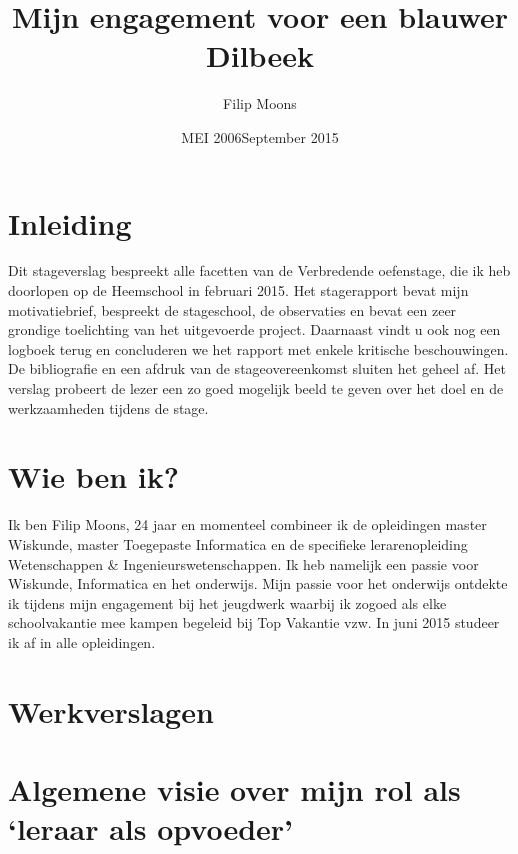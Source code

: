 \documentclass[a4paper,11pt]{article}
\author{Filip Moons}
\title{Mijn engagement voor een blauwer \\ Dilbeek}
\date{MEI 2006}
\date{September 2015}
\theoremstyle{definition}
\begin{document}
\maketitlepage


\tableofcontents
\newpage
\section{Inleiding}
Dit stageverslag bespreekt alle facetten van de Verbredende oefenstage, die ik heb doorlopen op de Heemschool in februari 2015. 
Het stagerapport bevat mijn motivatiebrief, bespreekt de stageschool, de observaties en bevat een zeer grondige toelichting van het uitgevoerde project. 
Daarnaast vindt u ook nog een logboek terug en concluderen we het rapport met enkele kritische beschouwingen. De bibliografie en een afdruk
van de stageovereenkomst sluiten het geheel af. Het verslag 
probeert de lezer een zo goed mogelijk beeld te geven over het doel en de 
werkzaamheden tijdens de stage.
\newpage
\section{Wie ben ik?}
Ik ben Filip Moons, 24 jaar en momenteel combineer ik de opleidingen master Wiskunde, master Toegepaste Informatica
en de specifieke lerarenopleiding Wetenschappen \& Ingenieurswetenschappen. Ik heb namelijk een passie voor
Wiskunde, Informatica en het onderwijs. Mijn passie voor het onderwijs ontdekte ik tijdens mijn engagement bij het jeugdwerk waarbij ik zogoed als
elke schoolvakantie mee  kampen begeleid bij Top Vakantie vzw. In juni 2015 studeer ik af in alle opleidingen. 

\section{Werkverslagen}

\section{Algemene visie over mijn rol als `leraar als opvoeder'}
 
\end{document}
